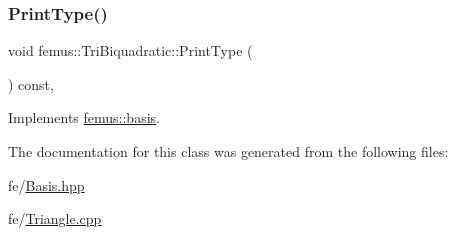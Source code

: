 \subsubsection{\texorpdfstring{Print\+Type()}{PrintType()}}
{\footnotesize\ttfamily void femus\+::\+Tri\+Biquadratic\+::\+Print\+Type (\begin{DoxyParamCaption}{ }\end{DoxyParamCaption}) const\hspace{0.3cm}{\ttfamily [inline]}, {\ttfamily [virtual]}}



Implements \mbox{\hyperlink{classfemus_1_1basis_abbae7bf8f31ec5793c911bc6d4ea0572}{femus\+::basis}}.



The documentation for this class was generated from the following files\+:\begin{DoxyCompactItemize}
\item 
fe/\mbox{\hyperlink{_basis_8hpp}{Basis.\+hpp}}\item 
fe/\mbox{\hyperlink{_triangle_8cpp}{Triangle.\+cpp}}\end{DoxyCompactItemize}
